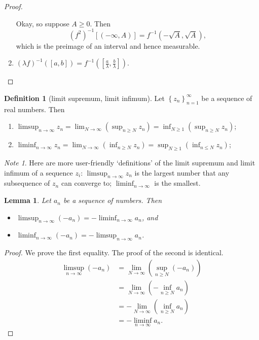 \documentclass[a4paper,12pt]{scrreprt}
\theoremstyle{definition}
\newtheorem{definition}{Definition}[section]
\theoremstyle{plain}
\newtheorem{lemma}{Lemma}[section]
\theoremstyle{remark}
\newtheorem{note}{Note}[section]
\begin{document}
\begin{proof}
\begin{enumerate}
      Okay, so suppose $A \geq 0$. Then
      \begin{equation*}
        {(f^{2})}^{-1}[(-\infty, A)] = f^{-1}(-\sqrt{A}, \sqrt{A}),
      \end{equation*}
      which is the preimage of an interval and hence measurable.

    \item ${(\lambda f)}^{-1}([a, b]) = f^{-1}\left( \left[ \frac{a}{\lambda}, \frac{b}{\lambda} \right] \right)$.
  \end{enumerate}
\end{proof}

\begin{definition}[limit supremum, limit infimum]
  \label{def:limsupliminf}
  Let ${\left\{ z_{n} \right\}}_{n=1}^{\infty}$ be a sequence of real numbers. Then
  \begin{enumerate}
    \item $\displaystyle\limsup_{n \to \infty} z_{n} = \lim_{N \to \infty}\left( \sup_{n \geq N} z_{n} \right) = \inf_{N \geq 1}\left( \sup_{n \geq N} z_{n} \right)$;

    \item $\displaystyle\liminf_{n \to \infty} z_{n} = \lim_{N \to \infty}\left( \inf_{n \geq N} z_{n} \right) = \sup_{N \geq 1} \left(  \inf_{n \leq N} z_{n} \right)$;
  \end{enumerate}
\end{definition}
\begin{note}
  Here are more user-friendly `definitions' of the limit supremum and limit infimum of a sequence $z_{i}$: $\limsup_{n \to \infty} z_{n}$ is the largest number that any subsequence of $z_{n}$ can converge to; $\liminf_{n \to \infty}$ is the smallest.
\end{note}

\begin{lemma}
  \label{lemma:limsupofnegativeisnegativeliminf}
  Let $a_{n}$ be a sequence of numbers. Then
  \begin{itemize}
    \item $\limsup_{n \to \infty} (- a_{n}) = - \liminf_{n \to \infty} a_{n}$, and
    \item $\liminf_{n \to \infty} (- a_{n}) = - \limsup_{n \to \infty} a_{n}$.
  \end{itemize}
\end{lemma}
\begin{proof}
  We prove the first equality. The proof of the second is identical.
  \begin{align*}
    \limsup_{n \to \infty} (-a_{n}) &= \lim_{N \to \infty}\left( \sup_{n \geq N} (-a_{n}) \right) \\
    &= \lim_{N \to \infty} \left( -\inf_{n \geq N} a_{n} \right) \\
    &= -\lim_{N \to \infty} \left( \inf_{n \geq N} a_{n} \right) \\
    &= -\liminf_{n \to \infty} a_{n}.
  \end{align*}
\end{proof}
\end{document}
